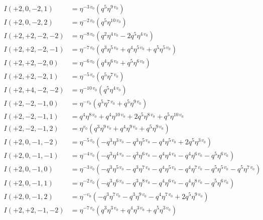 \documentclass[11pt,a4paper]{article}
\begin{document}
\begin{align*}
I(+2, 0, -2, 1) &= \eta^{-3 \, v_{0}} \left( q^{5} \eta^{9 \, v_{0}} \right) \\
I(+2, 0, -2, 2) &= \eta^{-2 \, v_{0}} \left( q^{5} \eta^{10 \, v_{0}} \right) \\
I(+2, +2, -2, -2) &= \eta^{-8 \, v_{0}} \left( q^{2} \eta^{4 \, v_{0}} - 2 q^{5} \eta^{4 \, v_{0}} \right) \\
I(+2, +2, -2, -1) &= \eta^{-7 \, v_{0}} \left( q^{3} \eta^{5 \, v_{0}} + q^{4} \eta^{5 \, v_{0}} + q^{5} \eta^{5 \, v_{0}} \right) \\
I(+2, +2, -2, 0) &= \eta^{-6 \, v_{0}} \left( q^{4} \eta^{6 \, v_{0}} + q^{5} \eta^{6 \, v_{0}} \right) \\
I(+2, +2, -2, 1) &= \eta^{-5 \, v_{0}} \left( q^{5} \eta^{7 \, v_{0}} \right) \\
I(+2, +4, -2, -2) &= \eta^{-10 \, v_{0}} \left( q^{5} \eta^{4 \, v_{0}} \right) \\
I(+2, -2, -1, 0) &= \eta^{-v_{0}} \left( q^{5} \eta^{7 \, v_{0}} + q^{5} \eta^{9 \, v_{0}} \right) \\
I(+2, -2, -1, 1) &= q^{4} \eta^{8 \, v_{0}} + q^{4} \eta^{10 \, v_{0}} + 2 q^{5} \eta^{8 \, v_{0}} + q^{5} \eta^{10 \, v_{0}} \\
I(+2, -2, -1, 2) &= \eta^{v_{0}} \left( q^{3} \eta^{9 \, v_{0}} + q^{4} \eta^{9 \, v_{0}} + q^{5} \eta^{9 \, v_{0}} \right) \\
I(+2, 0, -1, -2) &= \eta^{-5 \, v_{0}} \left( -q^{3} \eta^{3 \, v_{0}} - q^{3} \eta^{5 \, v_{0}} - q^{4} \eta^{5 \, v_{0}} + 2 q^{5} \eta^{3 \, v_{0}} \right) \\
I(+2, 0, -1, -1) &= \eta^{-4 \, v_{0}} \left( -q^{3} \eta^{4 \, v_{0}} - q^{3} \eta^{6 \, v_{0}} - q^{4} \eta^{4 \, v_{0}} - q^{4} \eta^{6 \, v_{0}} - q^{5} \eta^{6 \, v_{0}} \right) \\
I(+2, 0, -1, 0) &= \eta^{-3 \, v_{0}} \left( -q^{3} \eta^{5 \, v_{0}} - q^{3} \eta^{7 \, v_{0}} - q^{4} \eta^{5 \, v_{0}} - q^{4} \eta^{7 \, v_{0}} - q^{5} \eta^{5 \, v_{0}} - q^{5} \eta^{7 \, v_{0}} \right) \\
I(+2, 0, -1, 1) &= \eta^{-2 \, v_{0}} \left( -q^{3} \eta^{6 \, v_{0}} - q^{3} \eta^{8 \, v_{0}} - q^{4} \eta^{6 \, v_{0}} - q^{4} \eta^{8 \, v_{0}} - q^{5} \eta^{6 \, v_{0}} \right) \\
I(+2, 0, -1, 2) &= \eta^{-v_{0}} \left( -q^{3} \eta^{7 \, v_{0}} - q^{3} \eta^{9 \, v_{0}} - q^{4} \eta^{7 \, v_{0}} + 2 q^{5} \eta^{9 \, v_{0}} \right) \\
I(+2, +2, -1, -2) &= \eta^{-7 \, v_{0}} \left( q^{3} \eta^{3 \, v_{0}} + q^{4} \eta^{3 \, v_{0}} + q^{5} \eta^{3 \, v_{0}} \right) \\

\end{align*}
\end{document}
